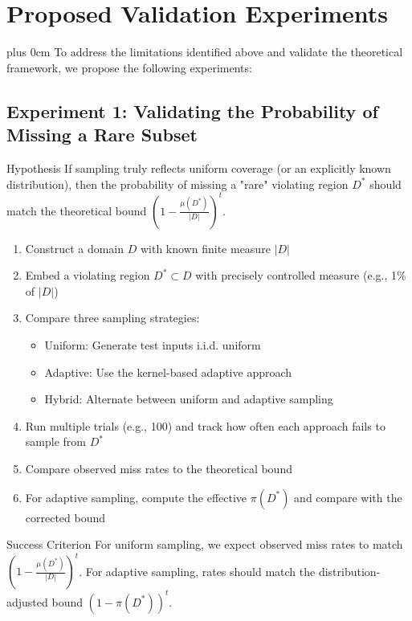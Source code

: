 \documentclass[11pt,a4paper]{article}
\newcommand{\justifytext}{\leftskip=0pt \rightskip=0pt plus 0cm}
\begin{document}
\section{Proposed Validation Experiments}

\justifytext
To address the limitations identified above and validate the theoretical framework, we propose the following experiments:

\subsection{Experiment 1: Validating the Probability of Missing a Rare Subset}

\begin{theorembox}{Hypothesis}
If sampling truly reflects uniform coverage (or an explicitly known distribution), then the probability of missing a "rare" violating region $D^*$ should match the theoretical bound $\left(1 - \frac{\mu(D^*)}{|D|}\right)^t$.
\end{theorembox}

\begin{tcolorbox}[
  colback=blue!5!white,
  colframe=blue!75!black,
  title=Experimental Design,
  fonttitle=\bfseries
]
\begin{enumerate}
\item Construct a domain $D$ with known finite measure $|D|$
\item Embed a violating region $D^* \subset D$ with precisely controlled measure (e.g., 1\% of $|D|$)
\item Compare three sampling strategies:
   \begin{itemize}
   \item Uniform: Generate test inputs i.i.d. uniform
   \item Adaptive: Use the kernel-based adaptive approach
   \item Hybrid: Alternate between uniform and adaptive sampling
   \end{itemize}
\item Run multiple trials (e.g., 100) and track how often each approach fails to sample from $D^*$
\item Compare observed miss rates to the theoretical bound
\item For adaptive sampling, compute the effective $\pi(D^*)$ and compare with the corrected bound
\end{enumerate}
\end{tcolorbox}

\begin{definitionbox}{Success Criterion}
For uniform sampling, we expect observed miss rates to match $\left(1 - \frac{\mu(D^*)}{|D|}\right)^t$. For adaptive sampling, rates should match the distribution-adjusted bound $(1 - \pi(D^*))^t$.
\end{definitionbox}
\end{document}
